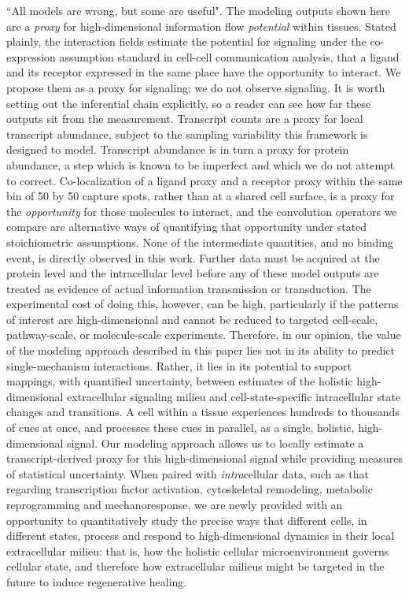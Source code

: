 \documentclass[10pt,letterpaper]{article}
\begin{document}
``All models are wrong, but some are useful". The modeling outputs shown here are a \textit{proxy} for high-dimensional information flow \textit{potential} within tissues. Stated plainly, the interaction fields estimate the potential for signaling under the co-expression assumption standard in cell-cell communication analysis, that a ligand and its receptor expressed in the same place have the opportunity to interact. We propose them as a proxy for signaling; we do not observe signaling. It is worth setting out the inferential chain explicitly, so a reader can see how far these outputs sit from the measurement. Transcript counts are a proxy for local transcript abundance, subject to the sampling variability this framework is designed to model. Transcript abundance is in turn a proxy for protein abundance, a step which is known to be imperfect and which we do not attempt to correct. Co-localization of a ligand proxy and a receptor proxy within the same bin of 50 by 50 capture spots, rather than at a shared cell surface, is a proxy for the \textit{opportunity} for those molecules to interact, and the convolution operators we compare are alternative ways of quantifying that opportunity under stated stoichiometric assumptions. None of the intermediate quantities, and no binding event, is directly observed in this work. Further data must be acquired at the protein level and the intracellular level before any of these model outputs are treated as evidence of actual information transmission or transduction. The experimental cost of doing this, however, can be high, particularly if the patterns of interest are high-dimensional and cannot be reduced to targeted cell-scale, pathway-scale, or molecule-scale experiments. Therefore, in our opinion, the value of the modeling approach described in this paper lies not in its ability to predict single-mechanism interactions. Rather, it lies in its potential to support mappings, with quantified uncertainty, between estimates of the holistic high-dimensional extracellular signaling milieu and cell-state-specific intracellular state changes and transitions. A cell within a tissue experiences hundreds to thousands of cues at once, and processes these cues in parallel, as a single, holistic, high-dimensional signal. Our modeling approach allows us to locally estimate a transcript-derived proxy for this high-dimensional signal while providing measures of statistical uncertainty. When paired with \textit{intra}cellular data, such as that regarding transcription factor activation, cytoskeletal remodeling, metabolic reprogramming and mechanoresponse, we are newly provided with an opportunity to quantitatively study the precise ways that different cells, in different states, process and respond to high-dimensional dynamics in their local extracellular milieu: that is, how the holistic cellular microenvironment governs cellular state, and therefore how extracellular milieus might be targeted in the future to induce regenerative healing.
\end{document}
